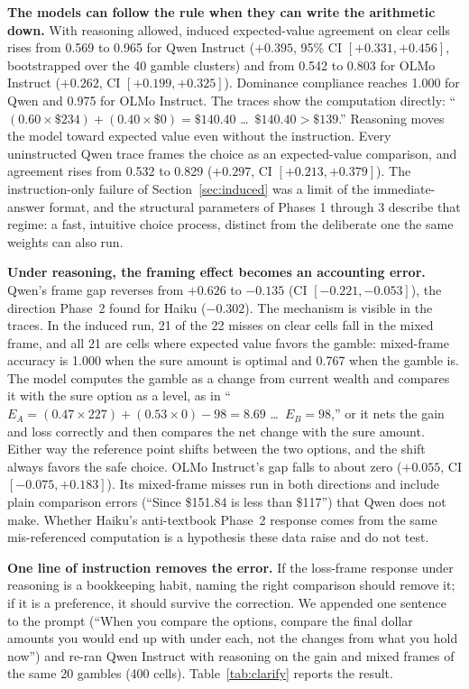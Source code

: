 \documentclass[11pt]{article}
\begin{document}
\textbf{The models can follow the rule when they can write the arithmetic down.} With reasoning allowed,
induced expected-value agreement on clear cells rises from 0.569 to 0.965 for Qwen Instruct ($+0.395$,
95\% CI $[+0.331, +0.456]$, bootstrapped over the 40 gamble clusters) and from 0.542 to 0.803 for OLMo
Instruct ($+0.262$, CI $[+0.199, +0.325]$). Dominance compliance reaches 1.000 for Qwen and 0.975 for OLMo
Instruct. The traces show the computation directly: ``$(0.60 \times \$234) + (0.40 \times \$0) =
\$140.40$ \ldots\ $\$140.40 > \$139$.'' Reasoning moves the model toward expected value even without the
instruction. Every uninstructed Qwen trace frames the choice as an expected-value comparison, and
agreement rises from 0.532 to 0.829 ($+0.297$, CI $[+0.213, +0.379]$). The instruction-only failure of
Section~\ref{sec:induced} was a limit of the immediate-answer format, and the structural parameters of Phases 1
through 3 describe that regime: a fast, intuitive choice process, distinct from the deliberate one the
same weights can also run.

\textbf{Under reasoning, the framing effect becomes an accounting error.} Qwen's frame gap reverses from
$+0.626$ to $-0.135$ (CI $[-0.221, -0.053]$), the direction Phase~2 found for Haiku ($-0.302$). The
mechanism is visible in the traces. In the induced run, 21 of the 22 misses on clear cells fall in the
mixed frame, and all 21 are cells where expected value favors the gamble: mixed-frame accuracy is 1.000
when the sure amount is optimal and 0.767 when the gamble is. The model computes the gamble as a change
from current wealth and compares it with the sure option as a level, as in ``$E_A = (0.47 \times 227) +
(0.53 \times 0) - 98 = 8.69$ \ldots\ $E_B = 98$,'' or it nets the gain and loss correctly and then
compares the net change with the sure amount. Either way the reference point shifts between the two
options, and the shift always favors the safe choice. OLMo Instruct's gap falls to about zero
($+0.055$, CI $[-0.075, +0.183]$). Its mixed-frame misses run in both directions and include plain
comparison errors (``Since \$151.84 is less than \$117'') that Qwen does not make. Whether Haiku's
anti-textbook Phase~2 response comes from the same mis-referenced computation is a hypothesis these data
raise and do not test.

\textbf{One line of instruction removes the error.} If the loss-frame response under reasoning is a
bookkeeping habit, naming the right comparison should remove it; if it is a preference, it should survive
the correction. We appended one sentence to the prompt (``When you compare the options, compare the final
dollar amounts you would end up with under each, not the changes from what you hold now'') and re-ran
Qwen Instruct with reasoning on the gain and mixed frames of the same 20 gambles (400 cells).
Table~\ref{tab:clarify} reports the result.
\end{document}
